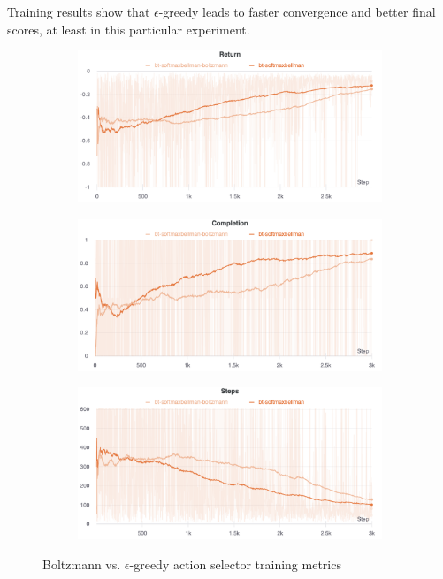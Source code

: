 \documentclass[a4paper,10pt]{report}
\begin{document}
Training results show that $\epsilon$-greedy leads to faster convergence and better final scores, at least in this particular experiment.

\begin{figure}[h]
	\centering
	\captionsetup[subfigure]{justification=centering}
	\begin{subfigure}[b]{\linewidth}
		\includegraphics[width=\textwidth]{boltzmann-epsgreedy-returns}
	\end{subfigure}
	
	\begin{subfigure}[b]{\linewidth}
		\includegraphics[width=\textwidth]{boltzmann-epsgreedy-completions}
	\end{subfigure}
	
	\begin{subfigure}[b]{\linewidth}
		\includegraphics[width=\textwidth]{boltzmann-epsgreedy-steps}
	\end{subfigure}

	\caption{Boltzmann vs. $\epsilon$-greedy action selector training metrics}
	\label{fig:boltzmann-epsgreedy-metrics}
\end{figure}
\clearpage
\end{document}
